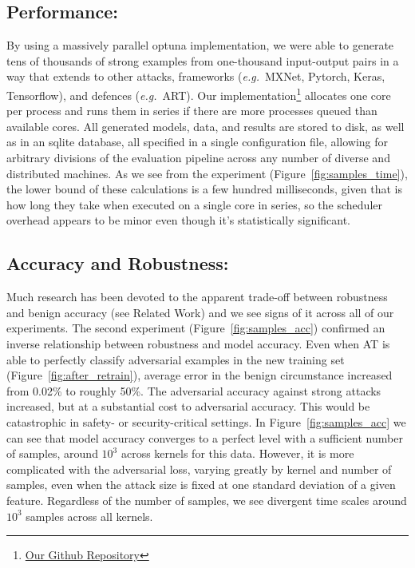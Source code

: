 \documentclass[runningheads]{llncs}
\begin{document}
\subsection{Performance: }
By using a massively parallel optuna \cite{optuna} implementation, we were able to generate tens of thousands of strong examples from one-thousand input-output pairs in a way that extends to other attacks, frameworks 
(\textit{e.g.}~MXNet, Pytorch, Keras, Tensorflow), and defences (\textit{e.g.}~ART). Our implementation\footnote{\href{https://github.com/simplymathematics/deckard}{Our Github Repository}} allocates one core per process and runs them in series if there are more processes queued than available cores. All generated models, data, and results are stored to disk, as well as in an sqlite database, all specified in a single configuration file, allowing for arbitrary divisions of the evaluation pipeline across any number of diverse and distributed machines. As we see from the experiment (Figure~\ref{fig:samples_time}), the lower bound of these calculations is a few hundred milliseconds, given that is how long they take when executed on a single core in series, so the scheduler overhead appears to be minor even though it's statistically significant.

\subsection{Accuracy and Robustness:}
Much research has been devoted to the apparent trade-off between robustness and benign accuracy (see Related Work) and we see signs of it across all of our experiments. The second experiment (Figure~\ref{fig:samples_acc}) confirmed an inverse relationship between robustness and model accuracy. Even when AT is able to perfectly classify adversarial examples in the new training set (Figure~\ref{fig:after_retrain}), average error in the benign circumstance increased from 0.02\% to roughly 50\%. The adversarial accuracy against strong attacks increased, but at a substantial cost to adversarial accuracy. This would be catastrophic in safety- or security-critical settings. In Figure~\ref{fig:samples_acc} we can see that model accuracy converges to a perfect level with a sufficient number of samples, around $10^3$ across kernels for this data. However, it is more complicated with the adversarial loss, varying greatly by kernel and number of samples, even when the attack size is fixed at one standard deviation of a given feature. Regardless of the number of samples, we see divergent time scales around $10^3$ samples across all kernels.
\end{document}
